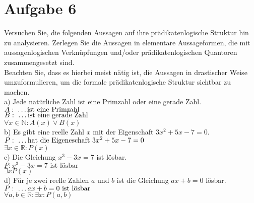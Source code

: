 \section*{Aufgabe 6}

Versuchen Sie, die folgenden Aussagen auf ihre prädikatenlogische Struktur hin zu analysieren. Zerlegen Sie die Aussagen in elementare Aussageformen, die mit aussagenlogischen Verknüpfungen und/oder prädikatenlogischen Quantoren zusammengesetzt sind.\\

Beachten Sie, dass es hierbei meist nätig ist, die Aussagen in drastischer Weise umzuformulieren, um die formale prädikatenlogische Struktur sichtbar zu machen.\\

a) Jede natürliche Zahl ist eine Primzahl oder eine gerade Zahl.\\

$A: \text{ \dots ist eine Primzahl}$\\

$B: \text{ \dots ist eine gerade Zahl}$\\

$\forall x \in \mathbb{N} : A(x) \lor B(x)$\\

b) Es gibt eine reelle Zahl $x$ mit der Eigenschaft $3x^2 + 5x - 7 = 0$.\\

$P: \text{ \dots hat die Eigeneschaft } 3x^2 + 5x - 7 = 0$\\

$\exists x \in \mathbb{R} : P(x)$\\

c) Die Gleichung $x^3 - 3x = 7$ ist lösbar.\\

$P: x^3 - 3x = 7 \text{ ist lösbar}$\\

$\exists x P(x)$\\

d) Für je zwei reelle Zahlen $a$ und $b$ ist die Gleichung $ax + b = 0$ lösbar.\\

$P: \text{ \dots} ax + b = 0 \text{ ist lösbar}$\\

$\forall a,b \in \mathbb{R} : \exists x : P(a,b)$
